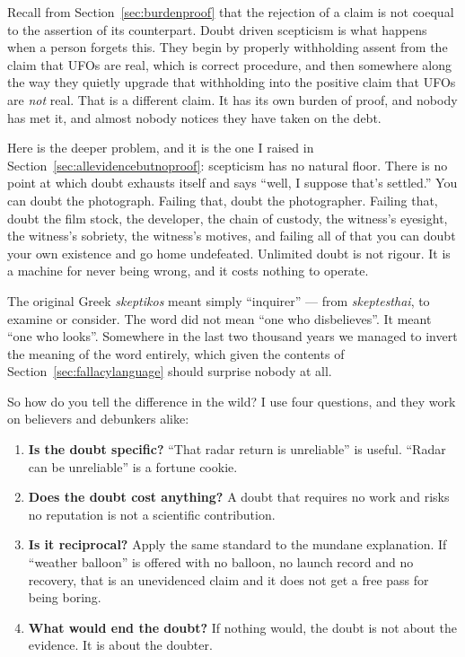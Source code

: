 Recall from Section~\ref{sec:burdenproof} that the rejection of a claim is not coequal to the assertion
of its counterpart. Doubt driven scepticism is what happens when a person forgets
this. They begin by properly withholding assent from the claim that UFOs are real,
which is correct procedure, and then somewhere along the way they quietly upgrade
that withholding into the positive claim that UFOs are \emph{not} real. That is a
different claim. It has its own burden of proof, and nobody has met it, and almost
nobody notices they have taken on the debt.

Here is the deeper problem, and it is the one I raised in Section~\ref{sec:allevidencebutnoproof}: scepticism has
no natural floor. There is no point at which doubt exhausts itself and says ``well, I
suppose that's settled.'' You can doubt the photograph. Failing that, doubt the
photographer. Failing that, doubt the film stock, the developer, the chain of
custody, the witness's eyesight, the witness's sobriety, the witness's motives, and
failing all of that you can doubt your own existence and go home undefeated.
Unlimited doubt is not rigour. It is a machine for never being wrong, and it costs
nothing to operate.

\begin{funfact}
The original Greek \emph{skeptikos} meant simply ``inquirer'' --- from
\emph{skeptesthai}, to examine or consider. The word did not mean ``one who
disbelieves''. It meant ``one who looks''. Somewhere in the last two thousand years
we managed to invert the meaning of the word entirely, which given the contents of
Section~\ref{sec:fallacylanguage} should surprise nobody at all.
\end{funfact}

So how do you tell the difference in the wild? I use four questions, and they work on
believers and debunkers alike:

\begin{enumerate}[leftmargin=1.6em,itemsep=3pt]
  \item \textbf{Is the doubt specific?} ``That radar return is unreliable'' is
  useful. ``Radar can be unreliable'' is a fortune cookie.
  \item \textbf{Does the doubt cost anything?} A doubt that requires no work and
  risks no reputation is not a scientific contribution.
  \item \textbf{Is it reciprocal?} Apply the same standard to the mundane explanation.
  If ``weather balloon'' is offered with no balloon, no launch record and no recovery,
  that is an unevidenced claim and it does not get a free pass for being boring.
  \item \textbf{What would end the doubt?} If nothing would, the doubt is not about
  the evidence. It is about the doubter.
\end{enumerate}

